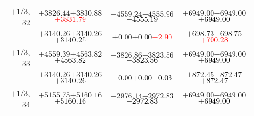 \documentclass[compress]{beamer}
\begin{document}
\begin{frame}
{\begin{tabular}{r | c | c | c}
$+$1/3, 32 & $+3826.44$\hspace{0.1 cm}$+3830.88$\hspace{0.1 cm}\textcolor{red}{$+3831.79$} & $-4559.24$\hspace{0.1 cm}$-4555.96$\hspace{0.1 cm}\textcolor{black}{$-4555.19$} & $+6949.00$\hspace{0.1 cm}$+6949.00$\hspace{0.1 cm}\textcolor{black}{$+6949.00$} \\
           & $+3140.26$\hspace{0.1 cm}$+3140.26$\hspace{0.1 cm}\textcolor{black}{$+3140.25$} & $+0.00$\hspace{0.1 cm}$+0.00$\hspace{0.1 cm}\textcolor{red}{$-2.90$} & $+698.73$\hspace{0.1 cm}$+698.75$\hspace{0.1 cm}\textcolor{red}{$+700.28$} \\
$+$1/3, 33 & $+4559.39$\hspace{0.1 cm}$+4563.82$\hspace{0.1 cm}\textcolor{black}{$+4563.82$} & $-3826.86$\hspace{0.1 cm}$-3823.56$\hspace{0.1 cm}\textcolor{black}{$-3823.56$} & $+6949.00$\hspace{0.1 cm}$+6949.00$\hspace{0.1 cm}\textcolor{black}{$+6949.00$} \\
           & $+3140.26$\hspace{0.1 cm}$+3140.26$\hspace{0.1 cm}\textcolor{black}{$+3140.26$} & $-0.00$\hspace{0.1 cm}$+0.00$\hspace{0.1 cm}\textcolor{black}{$+0.03$} & $+872.45$\hspace{0.1 cm}$+872.47$\hspace{0.1 cm}\textcolor{black}{$+872.47$} \\
$+$1/3, 34 & $+5155.75$\hspace{0.1 cm}$+5160.16$\hspace{0.1 cm}\textcolor{black}{$+5160.16$} & $-2976.14$\hspace{0.1 cm}$-2972.83$\hspace{0.1 cm}\textcolor{black}{$-2972.83$} & $+6949.00$\hspace{0.1 cm}$+6949.00$\hspace{0.1 cm}\textcolor{black}{$+6949.00$} \\

\end{tabular}}
\end{frame}
\end{document}
